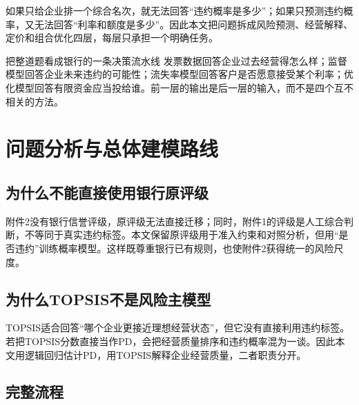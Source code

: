 \documentclass[12pt,a4paper]{ctexart}
\begin{document}
如果只给企业排一个综合名次，就无法回答“违约概率是多少”；如果只预测违约概率，又无法回答“利率和额度是多少”。因此本文把问题拆成风险预测、经营解释、定价和组合优化四层，每层只承担一个明确任务。

\begin{intuitionbox}{把整道题看成银行的一条决策流水线}
发票数据回答企业过去经营得怎么样；监督模型回答企业未来违约的可能性；流失率模型回答客户是否愿意接受某个利率；优化模型回答有限资金应当投给谁。前一层的输出是后一层的输入，而不是四个互不相关的方法。
\end{intuitionbox}

\section{问题分析与总体建模路线}

\subsection{为什么不能直接使用银行原评级}

附件2没有银行信誉评级，原评级无法直接迁移；同时，附件1的评级是人工综合判断，不等同于真实违约标签。本文保留原评级用于准入约束和对照分析，但用“是否违约”训练概率模型。这样既尊重银行已有规则，也使附件2获得统一的风险尺度。

\subsection{为什么TOPSIS不是风险主模型}

TOPSIS适合回答“哪个企业更接近理想经营状态”，但它没有直接利用违约标签。若把TOPSIS分数直接当作PD，会把经营质量排序和违约概率混为一谈。因此本文用逻辑回归估计PD，用TOPSIS解释企业经营质量，二者职责分开。

\subsection{完整流程}
\end{document}
